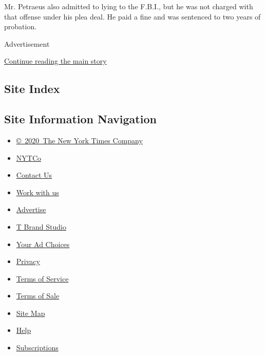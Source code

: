 Mr. Petraeus also admitted to lying to the F.B.I., but he was not
charged with that offense under his plea deal. He paid a fine and was
sentenced to two years of probation.

Advertisement

\protect\hyperlink{after-bottom}{Continue reading the main story}

\hypertarget{site-index}{%
\subsection{Site Index}\label{site-index}}

\hypertarget{site-information-navigation}{%
\subsection{Site Information
Navigation}\label{site-information-navigation}}

\begin{itemize}
\tightlist
\item
  \href{https://help.nytimes.com/hc/en-us/articles/115014792127-Copyright-notice}{©~2020~The
  New York Times Company}
\end{itemize}

\begin{itemize}
\tightlist
\item
  \href{https://www.nytco.com/}{NYTCo}
\item
  \href{https://help.nytimes.com/hc/en-us/articles/115015385887-Contact-Us}{Contact
  Us}
\item
  \href{https://www.nytco.com/careers/}{Work with us}
\item
  \href{https://nytmediakit.com/}{Advertise}
\item
  \href{http://www.tbrandstudio.com/}{T Brand Studio}
\item
  \href{https://www.nytimes.com/privacy/cookie-policy\#how-do-i-manage-trackers}{Your
  Ad Choices}
\item
  \href{https://www.nytimes.com/privacy}{Privacy}
\item
  \href{https://help.nytimes.com/hc/en-us/articles/115014893428-Terms-of-service}{Terms
  of Service}
\item
  \href{https://help.nytimes.com/hc/en-us/articles/115014893968-Terms-of-sale}{Terms
  of Sale}
\item
  \href{https://spiderbites.nytimes.com}{Site Map}
\item
  \href{https://help.nytimes.com/hc/en-us}{Help}
\item
  \href{https://www.nytimes.com/subscription?campaignId=37WXW}{Subscriptions}
\end{itemize}
